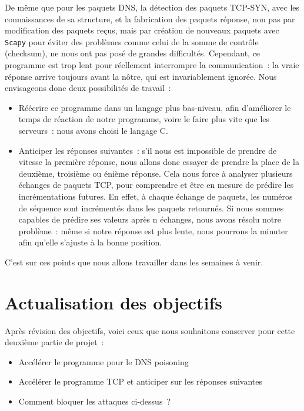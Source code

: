 \documentclass[a4paper, 12pt,twoside]{article}
\begin{document}
      De même que pour les paquets DNS, la détection des paquets TCP-SYN, avec les connaissances de sa structure, et la fabrication des paquets réponse, non pas par modification des paquets reçus, mais par création de nouveaux paquets avec \verb!Scapy! pour éviter des problèmes comme celui de la somme de contrôle (checksum), ne nous ont pas posé de grandes difficultés. Cependant, ce programme est trop lent pour réellement interrompre la communication~: la vraie réponse arrive toujours avant la nôtre, qui est invariablement ignorée. Nous envisageons donc deux possibilités de travail~:
  \begin{itemize}[label=\color{bleu303}\textbullet{}]
      \item Réécrire ce programme dans un langage plus bas-niveau, afin d'améliorer le temps de réaction de notre programme, voire le faire plus vite que les serveurs~: nous avons choisi le langage C.
      \item Anticiper les réponses suivantes~: s'il nous est impossible de prendre de vitesse la première réponse, nous allons donc essayer de prendre la place de la deuxième, troisième ou énième réponse. Cela nous force à analyser plusieurs échanges de paquets TCP, pour comprendre et être en mesure de prédire les incrémentations futures. En effet, à chaque échange de paquets, les numéros de séquence sont incrémentés dans les paquets retournés. Si nous sommes capables de prédire ses valeurs après n échanges, nous avons résolu notre problème~: même si notre réponse est plus lente, nous pourrons la minuter afin qu'elle s'ajuste à la bonne position.
  \end{itemize}


  C'est sur ces points que nous allons travailler dans les semaines à venir.
\newpage

\section{Actualisation des objectifs}

    Après révision des objectifs, voici ceux que nous souhaitons conserver pour cette deuxième partie de projet~:

    \begin{itemize}[label=\color{bleu303}\textbullet{}]
        \item Accélérer le programme pour le DNS poisoning
        \item Accélérer le programme TCP et anticiper sur les réponses suivantes
        \item Comment bloquer les attaques ci-dessus~?
    \end{itemize}
\end{document}
